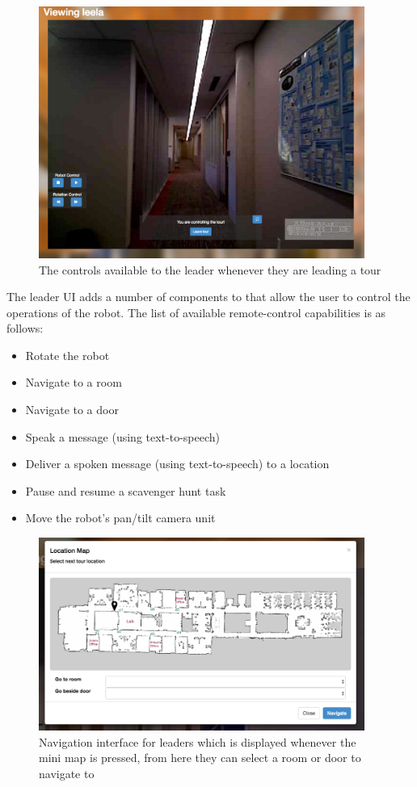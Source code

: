 \documentclass[
  oneside,
  11pt, a4paper,
  footinclude=true,
  headinclude=true,
  cleardoublepage=empty
]{article}
\begin{document}
\begin{figure}
  \centering
  \includegraphics[width=0.95\textwidth]{leader_ui}
  \caption{The controls available to the leader whenever they are leading a
  tour}
  \label{fig:leader_controls}
\end{figure}

The leader UI adds a number of components to that allow the user to control the
operations of the robot. The list of available remote-control capabilities is
as follows:

\begin{itemize}
  \item Rotate the robot
  \item Navigate to a room 
  \item Navigate to a door 
  \item Speak a message (using text-to-speech)
  \item Deliver a spoken message (using text-to-speech) to a location
  \item Pause and resume a scavenger hunt task
  \item Move the robot's pan/tilt camera unit
\end{itemize}

\begin{figure}
  \centering
  \includegraphics[width=0.95\textwidth]{nav_ui}
  \caption{Navigation interface for leaders which is displayed whenever the
  mini map is pressed, from here they can select a room or door to navigate to}
  \label{fig:nav_interface}
\end{figure}
\end{document}

